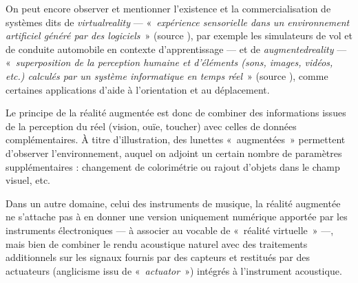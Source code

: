 On peut encore observer et mentionner l'existence et la commercialisation de systèmes dits de \emph{\gls{virtualreality}}
 --- «~\textit{expérience sensorielle dans un environnement artificiel généré par des logiciels}~» (source \href{https://fr.wikipedia.org/wiki/R\%C3\%A9alit\%C3\%A9_virtuelle}{\faWikipediaW}), par exemple les simulateurs de vol et de conduite automobile en contexte d'apprentissage --- et de \emph{\gls{augmentedreality}} --- «~\textit{superposition de la perception humaine et d'éléments (sons, images, vidéos, etc.) calculés par un système informatique en temps réel}~» (source \href{https://fr.wikipedia.org/wiki/R\%C3\%A9alit\%C3\%A9_augment\%C3\%A9e}{\faWikipediaW}), comme certaines applications d'aide à l'orientation et au déplacement.

Le principe de la réalité augmentée est donc de combiner des informations issues de la perception du réel (vision, ouïe, toucher) avec celles de données complémentaires. À titre d'illustration, des lunettes «~augmentées~» permettent d'observer l'environnement, auquel on adjoint un certain nombre de paramètres supplémentaires : changement de colorimétrie ou rajout d'objets dans le champ visuel, etc. 

Dans un autre domaine, celui des instruments de musique, la réalité augmentée ne s'attache pas à en donner une version uniquement numérique apportée par les instruments électroniques --- à associer au vocable de «~réalité virtuelle~» ---, mais bien de combiner le rendu acoustique naturel avec des traitements additionnels sur les signaux fournis par des capteurs et restitués par des actuateurs (anglicisme issu de «~\textit{actuator}~») intégrés à l'instrument acoustique.

